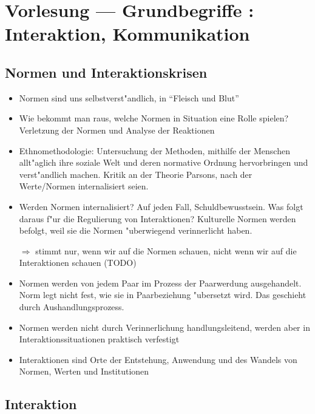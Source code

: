 \section{Vorlesung  --- Grundbegriffe : Interaktion, Kommunikation}
\subsection{Normen und Interaktionskrisen}
\begin{itemize}
	\item
		Normen sind uns selbstverst"andlich, in \enquote{Fleisch und Blut}
	\item
		Wie bekommt man raus, welche Normen in Situation eine Rolle spielen? Verletzung der Normen und Analyse der Reaktionen
	\item
		Ethnomethodologie: Untersuchung der Methoden, mithilfe der Menschen allt"aglich ihre soziale Welt und deren normative Ordnung hervorbringen und verst"andlich machen. Kritik an der Theorie Parsons, nach der Werte/Normen internalisiert seien.
	\item
		Werden Normen internalisiert? Auf jeden Fall, Schuldbewusstsein. Was folgt daraus f"ur die Regulierung von Interaktionen? Kulturelle Normen werden befolgt, weil sie die Normen "uberwiegend verinnerlicht haben.

		$\Rightarrow$ stimmt nur, wenn wir auf die Normen schauen, nicht wenn wir auf die Interaktionen schauen (TODO)
	\item
		Normen werden von jedem Paar im Prozess der Paarwerdung ausgehandelt. Norm legt nicht fest, wie sie in Paarbeziehung "ubersetzt wird. Das geschieht durch Aushandlungsprozess.
	\item
		Normen werden nicht durch Verinnerlichung handlungsleitend, werden aber in Interaktionssituationen praktisch verfestigt
	\item
		Interaktionen sind Orte der Entstehung, Anwendung und des Wandels von Normen, Werten und Institutionen
\end{itemize}

\subsection{Interaktion}

